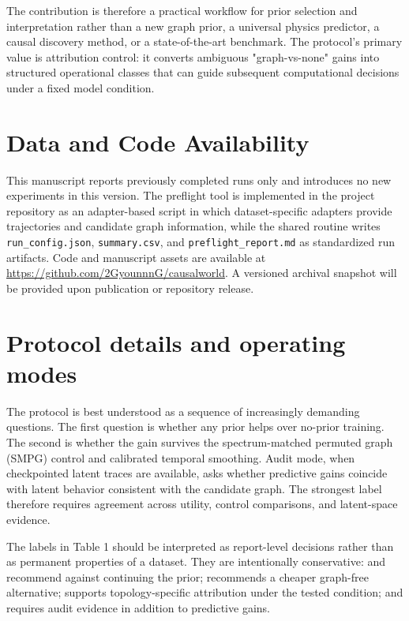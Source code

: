 \documentclass[preprint,12pt]{elsarticle}
\begin{document}
The contribution is therefore a practical workflow for prior 
selection and interpretation rather than a new graph prior, a 
universal physics predictor, a causal discovery method, or a 
state-of-the-art benchmark. The protocol's primary value is 
attribution control: it converts ambiguous "graph-vs-none" gains 
into structured operational classes that can guide subsequent 
computational decisions under a fixed model condition.

\section*{Data and Code Availability}
This manuscript reports previously completed runs only and introduces no new experiments in this version. The preflight tool is implemented in the project repository as an adapter-based script in which dataset-specific adapters provide trajectories and candidate graph information, while the shared routine writes \texttt{run\_config.json}, \texttt{summary.csv}, and \texttt{preflight\_report.md} as standardized run artifacts. Code and manuscript assets are available at \url{https://github.com/2GyounnnG/causalworld}. A versioned archival snapshot will be provided upon publication or repository release.

\FloatBarrier

\appendix

\section{Protocol details and operating modes}

The protocol is best understood as a sequence of increasingly demanding questions. The first question is whether any prior helps over no-prior training. The second is whether the gain survives the spectrum-matched permuted graph (SMPG) control and calibrated temporal smoothing. Audit mode, when checkpointed latent traces are available, asks whether predictive gains coincide with latent behavior consistent with the candidate graph. The strongest label therefore requires agreement across utility, control comparisons, and latent-space evidence.

The labels in Table 1 should be interpreted as report-level decisions rather than as permanent properties of a dataset. They are intentionally conservative:  and  recommend against continuing the prior;  recommends a cheaper graph-free alternative;  supports topology-specific attribution under the tested condition; and  requires audit evidence in addition to predictive gains.
\end{document}
